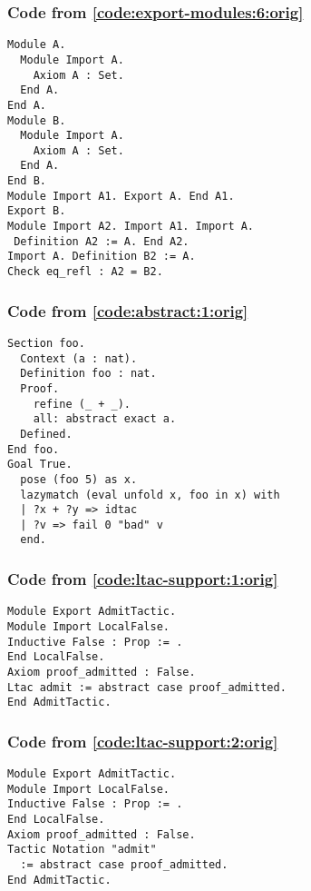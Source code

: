 \documentclass[a4paper,USenglish,cleveref,autoref,thm-restate]{lipics-v2021}
\begin{document}
\subsubsection{Code from \autoref{code:export-modules:6:orig}}\label{code:export-modules:6}
\begin{verbatim}
Module A.
  Module Import A.
    Axiom A : Set.
  End A.
End A.
Module B.
  Module Import A.
    Axiom A : Set.
  End A.
End B.
Module Import A1. Export A. End A1.
Export B.
Module Import A2. Import A1. Import A.
 Definition A2 := A. End A2.
Import A. Definition B2 := A.
Check eq_refl : A2 = B2.
\end{verbatim}

\subsubsection{Code from \autoref{code:abstract:1:orig}}\label{code:abstract:1}
\begin{verbatim}
Section foo.
  Context (a : nat).
  Definition foo : nat.
  Proof.
    refine (_ + _).
    all: abstract exact a.
  Defined.
End foo.
Goal True.
  pose (foo 5) as x.
  lazymatch (eval unfold x, foo in x) with
  | ?x + ?y => idtac
  | ?v => fail 0 "bad" v
  end.
\end{verbatim}

\subsubsection{Code from \autoref{code:ltac-support:1:orig}}\label{code:ltac-support:1}
\begin{verbatim}
Module Export AdmitTactic.
Module Import LocalFalse.
Inductive False : Prop := .
End LocalFalse.
Axiom proof_admitted : False.
Ltac admit := abstract case proof_admitted.
End AdmitTactic.
\end{verbatim}
\subsubsection{Code from \autoref{code:ltac-support:2:orig}}\label{code:ltac-support:2}
\begin{verbatim}
Module Export AdmitTactic.
Module Import LocalFalse.
Inductive False : Prop := .
End LocalFalse.
Axiom proof_admitted : False.
Tactic Notation "admit"
  := abstract case proof_admitted.
End AdmitTactic.
\end{verbatim}
\end{document}
